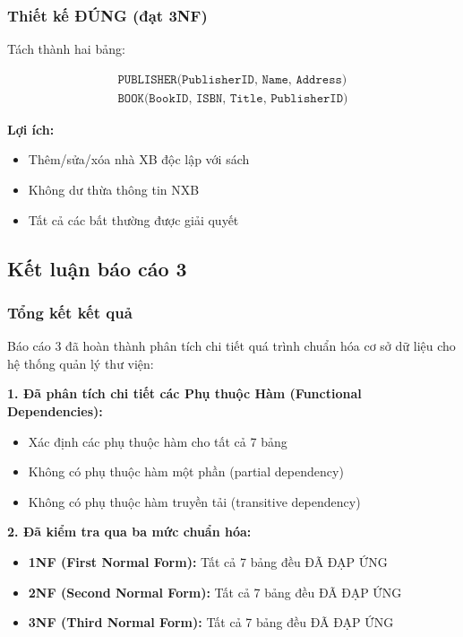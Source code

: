 \documentclass[12pt,a4paper]{article}
\begin{document}
\subsubsection{Thiết kế ĐÚNG (đạt 3NF)}

Tách thành hai bảng:

\begin{align*}
\texttt{PUBLISHER(PublisherID, Name, Address)} \\
\texttt{BOOK(BookID, ISBN, Title, PublisherID)}
\end{align*}

\textbf{Lợi ích:}
\begin{itemize}
    \item Thêm/sửa/xóa nhà XB độc lập với sách
    \item Không dư thừa thông tin NXB
    \item Tất cả các bất thường được giải quyết
\end{itemize}

\subsection{Kết luận báo cáo 3}

\subsubsection{Tổng kết kết quả}

Báo cáo 3 đã hoàn thành phân tích chi tiết quá trình chuẩn hóa cơ sở dữ liệu cho hệ thống quản lý thư viện:

\textbf{1. Đã phân tích chi tiết các Phụ thuộc Hàm (Functional Dependencies):}
\begin{itemize}
    \item Xác định các phụ thuộc hàm cho tất cả 7 bảng
    \item Không có phụ thuộc hàm một phần (partial dependency)
    \item Không có phụ thuộc hàm truyền tải (transitive dependency)
\end{itemize}

\textbf{2. Đã kiểm tra qua ba mức chuẩn hóa:}
\begin{itemize}
    \item \textbf{1NF (First Normal Form):} Tất cả 7 bảng đều ĐÃ ĐẠP ỨNG
    \item \textbf{2NF (Second Normal Form):} Tất cả 7 bảng đều ĐÃ ĐẠP ỨNG
    \item \textbf{3NF (Third Normal Form):} Tất cả 7 bảng đều ĐÃ ĐẠP ỨNG
\end{itemize}
\end{document}
